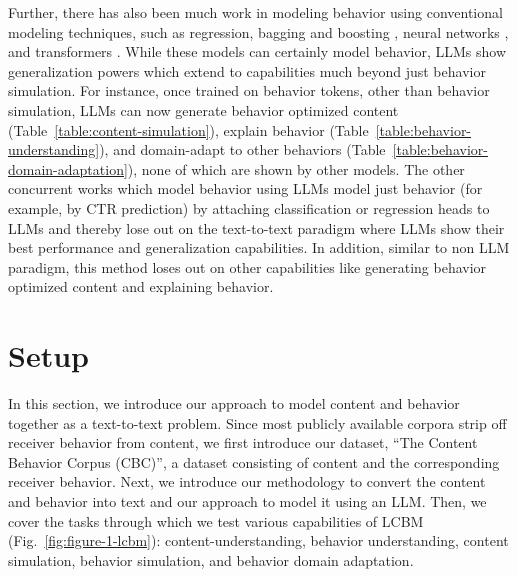 Further, there has also been much work in modeling behavior using conventional modeling techniques, such as regression, bagging and boosting \citep{mazloom2016multimodal,villarroel2019cutting}, neural networks \citep{ding2019social,wang2018retweet,khosla2014makes}, and transformers \citep{wu2021towards,xiao2022hierarchical}. While these models can certainly model behavior, LLMs show generalization powers which extend to capabilities much beyond just behavior simulation. For instance, once trained on behavior tokens, other than behavior simulation, LLMs can now generate behavior optimized content (Table~\ref{table:content-simulation}), explain behavior (Table~\ref{table:behavior-understanding}), and domain-adapt to other behaviors (Table~\ref{table:behavior-domain-adaptation}), none of which are shown by other models. The other concurrent works which model behavior using LLMs \citep{kang2023llms} model just behavior (for example, by CTR prediction) by attaching classification or regression heads to LLMs and thereby lose out on the text-to-text paradigm where LLMs show their best performance and generalization capabilities. In addition, similar to non LLM paradigm, this method loses out on other capabilities like generating behavior optimized content and explaining behavior. 








\section{Setup}
\label{sec:Setup}
In this section, we introduce our approach to model content and behavior together as a text-to-text problem. Since most publicly available corpora strip off receiver behavior from content, we first introduce our dataset, ``The Content Behavior Corpus (CBC)'', a dataset consisting of content and the corresponding receiver behavior. Next, we introduce our methodology to convert the content and behavior into text and our approach to model it using an LLM. Then, we cover the tasks through which we test various capabilities of LCBM (Fig.~\ref{fig:figure-1-lcbm}): content-understanding, behavior understanding, content simulation, behavior simulation, and behavior domain adaptation. 

